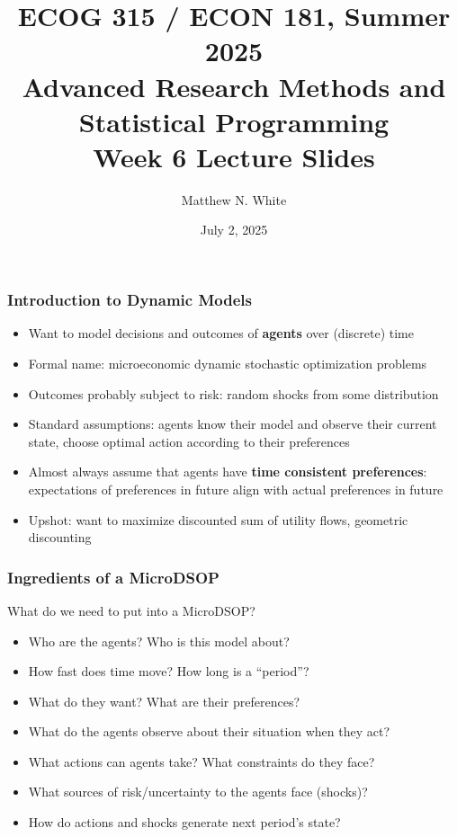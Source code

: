 \documentclass[aspectratio=169]{beamer}
\author{Matthew N. White}
\title[add]{ECOG 315 / ECON 181, Summer 2025 \\ Advanced Research Methods and Statistical Programming \\ Week 6 Lecture Slides}
\institute[HU]{Howard University}
\date{July 2, 2025}
\begin{document}
\begin{frame}
\maketitle
\end{frame}



\begin{frame}
\frametitle{Introduction to Dynamic Models}
\begin{itemize}
	\item Want to model decisions and outcomes of \textbf{agents} over (discrete) time
	
	\item Formal name: microeconomic dynamic stochastic optimization problems
	
	\item Outcomes probably subject to risk: random shocks from some distribution
	
	\item Standard assumptions: agents know their model and observe their current state, choose optimal action according to their preferences
	
	\item Almost always assume that agents have \textbf{time consistent preferences}: expectations of preferences in future align with actual preferences in future
	
	\item Upshot: want to maximize discounted sum of utility flows, geometric discounting
\end{itemize}
\end{frame}


\begin{frame}
\frametitle{Ingredients of a MicroDSOP}

What do we need to put into a MicroDSOP?
\begin{itemize}
	\item Who are the agents? Who is this model about?
	
	\item How fast does time move? How long is a ``period''?
	
	\item What do they want? What are their preferences?
	
	\item What do the agents observe about their situation when they act?
	
	\item What actions can agents take? What constraints do they face?
	
	\item What sources of risk/uncertainty to the agents face (shocks)?
	
	\item How do actions and shocks generate next period's state?
\end{itemize}

\end{frame}
\end{document}
